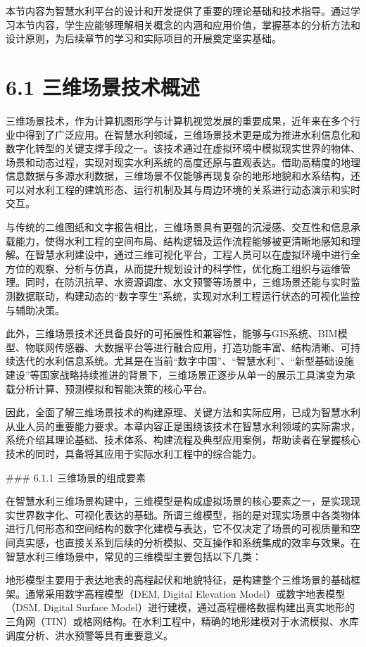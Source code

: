 本节内容为智慧水利平台的设计和开发提供了重要的理论基础和技术指导。通过学习本节内容，学生应能够理解相关概念的内涵和应用价值，掌握基本的分析方法和设计原则，为后续章节的学习和实际项目的开展奠定坚实基础。

\section{6.1 三维场景技术概述}

三维场景技术，作为计算机图形学与计算机视觉发展的重要成果，近年来在多个行业中得到了广泛应用。在智慧水利领域，三维场景技术更是成为推进水利信息化和数字化转型的关键支撑手段之一。该技术通过在虚拟环境中模拟现实世界的物体、场景和动态过程，实现对现实水利系统的高度还原与直观表达。借助高精度的地理信息数据与多源水利数据，三维场景不仅能够再现复杂的地形地貌和水系结构，还可以对水利工程的建筑形态、运行机制及其与周边环境的关系进行动态演示和实时交互。

与传统的二维图纸和文字报告相比，三维场景具有更强的沉浸感、交互性和信息承载能力，使得水利工程的空间布局、结构逻辑及运作流程能够被更清晰地感知和理解。在智慧水利建设中，通过三维可视化平台，工程人员可以在虚拟环境中进行全方位的观察、分析与仿真，从而提升规划设计的科学性，优化施工组织与运维管理。同时，在防汛抗旱、水资源调度、水文预警等场景中，三维场景还能与实时监测数据联动，构建动态的``数字孪生''系统，实现对水利工程运行状态的可视化监控与辅助决策。

此外，三维场景技术还具备良好的可拓展性和兼容性，能够与GIS系统、BIM模型、物联网传感器、大数据平台等进行融合应用，打造功能丰富、结构清晰、可持续迭代的水利信息系统。尤其是在当前``数字中国''、``智慧水利''、``新型基础设施建设''等国家战略持续推进的背景下，三维场景正逐步从单一的展示工具演变为承载分析计算、预测模拟和智能决策的核心平台。

因此，全面了解三维场景技术的构建原理、关键方法和实际应用，已成为智慧水利从业人员的重要能力要求。本章内容正是围绕该技术在智慧水利领域的实际需求，系统介绍其理论基础、技术体系、构建流程及典型应用案例，帮助读者在掌握核心技术的同时，具备将其应用于实际水利工程中的综合能力。

\#\#\# 6.1.1 三维场景的组成要素

在智慧水利三维场景构建中，三维模型是构成虚拟场景的核心要素之一，是实现现实世界数字化、可视化表达的基础。所谓三维模型，指的是对现实场景中各类物体进行几何形态和空间结构的数字化建模与表达，它不仅决定了场景的可视质量和空间真实感，也直接关系到后续的分析模拟、交互操作和系统集成的效率与效果。在智慧水利三维场景中，常见的三维模型主要包括以下几类：

地形模型主要用于表达地表的高程起伏和地貌特征，是构建整个三维场景的基础框架。通常采用数字高程模型（DEM, Digital Elevation Model）或数字地表模型（DSM, Digital Surface Model）进行建模，通过高程栅格数据构建出真实地形的三角网（TIN）或格网结构。在水利工程中，精确的地形建模对于水流模拟、水库调度分析、洪水预警等具有重要意义。

